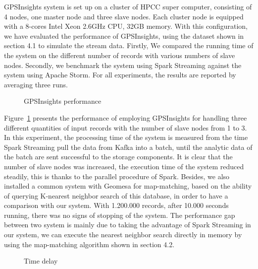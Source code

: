 \documentclass{acm_proc_article-sp}
\begin{document}
GPSInsights system is set up on a cluster of HPCC super computer, consisting of 4 nodes, one master node and three slave nodes. Each cluster node is equipped with a  8-cores Intel Xeon 2.6GHz CPU, 32GB memory. With this configuration, we have evaluated the performance of GPSInsights, using the dataset shown in section 4.1 to simulate the stream data. Firstly, We compared the running time of the system on the different number of records with various numbers of slave nodes. Secondly, we benchmark the system using Spark Streaming against the system using Apache Storm. For all experiments, the results are reported by averaging three runs. 
	
	
	\begin{figure}[h]
		\centering
		\caption{GPSInsights performance}
		\label{fig:performance}
	\end{figure}

Figure~\ref{fig:performance} presents the performance of employing GPSInsights for handling three different quantities of input records with the number of slave nodes from 1 to 3. In this experiment, the processing time of the system is measured from the time Spark Streaming pull the data from Kafka into a batch, until the analytic data of the batch are sent successful to the storage components. It is clear that the number of slave nodes was increased, the execution time of the system reduced steadily, this is thanks to the parallel procedure of Spark. Besides, we also installed a common system with Geomesa for map-matching, based on the ability of querying K-nearest neighbor search of this database, in order to have a comparison with our system. With 1.200.000 records, after 10.000 seconds running, there was no signs of stopping of the system. The performance gap between two system is mainly due to taking the advantage of Spark Streaming in our system,  we can execute the nearest neighbor search directly in memory by using the map-matching algorithm shown in section 4.2.

	\begin{figure}[h]
		\centering
		\caption{Time delay}
		\label{fig:timedelay}
	\end{figure}
	
\end{document}
